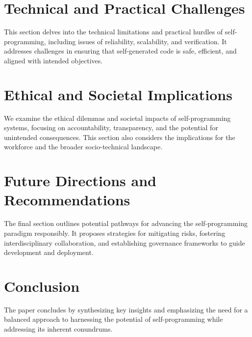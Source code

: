 \documentclass[]{article}
\begin{document}
\section{Technical and Practical Challenges}
This section delves into the technical limitations and practical hurdles of self-programming, including issues of reliability, scalability, and verification. It addresses challenges in ensuring that self-generated code is safe, efficient, and aligned with intended objectives.

\section{Ethical and Societal Implications}
We examine the ethical dilemmas and societal impacts of self-programming systems, focusing on accountability, transparency, and the potential for unintended consequences. This section also considers the implications for the workforce and the broader socio-technical landscape.

\section{Future Directions and Recommendations}
The final section outlines potential pathways for advancing the self-programming paradigm responsibly. It proposes strategies for mitigating risks, fostering interdisciplinary collaboration, and establishing governance frameworks to guide development and deployment.

\section{Conclusion}
The paper concludes by synthesizing key insights and emphasizing the need for a balanced approach to harnessing the potential of self-programming while addressing its inherent conundrums.
\end{document}
